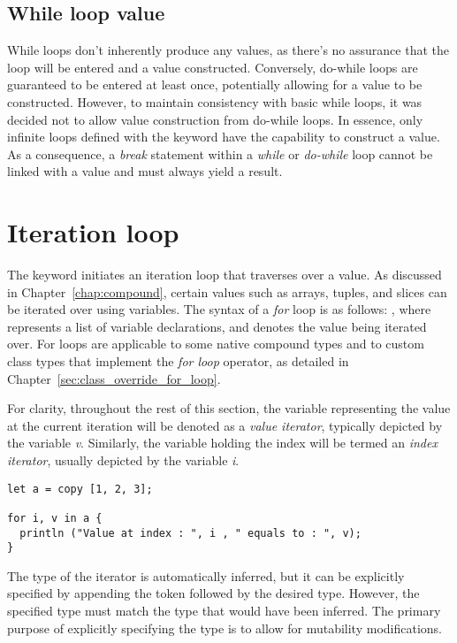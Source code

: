 \subsection{While loop value}

While loops don't inherently produce any values, as there's no assurance that
the loop will be entered and a value constructed. Conversely, do-while loops are
guaranteed to be entered at least once, potentially allowing for a value to be
constructed. However, to maintain consistency with basic while loops, it was
decided not to allow value construction from do-while loops. In essence, only
infinite loops defined with the  keyword have the capability to
construct a value. As a consequence, a \textit{break} statement within a
\textit{while} or \textit{do-while} loop cannot be linked with a value and must
always yield a  result.


\vfill%
\pagebreak

\section{Iteration loop}%
\label{sec:for_loop}

The keyword  initiates an iteration loop that traverses over a value.
As discussed in Chapter~\ref{chap:compound}, certain values such as arrays,
tuples, and slices can be iterated over using variables. The syntax of a
\textit{for} loop is as follows: , where  represents a list of variable declarations, and  denotes the
value being iterated over. For loops are applicable to some native compound
types and to custom class types that implement the \textit{for loop} operator,
as detailed in Chapter~\ref{sec:class_override_for_loop}.

For clarity, throughout the rest of this section, the variable representing the
value at the current iteration will be denoted as a \textit{value iterator},
typically depicted by the variable \textit{v}. Similarly, the variable holding
the index will be termed an \textit{index iterator}, usually depicted by the
variable \textit{i}.

\begin{lstlisting}[style=coloredverbatim, escapechar=@]
let a = copy [1, 2, 3];

for i, v in a {
  println ("Value at index : ", i , " equals to : ", v);
}
\end{lstlisting}

The type of the iterator is automatically inferred, but it can be explicitly
specified by appending the token \token{:} followed by the desired type.
However, the specified type must match the type that would have been inferred.
The primary purpose of explicitly specifying the type is to allow for mutability
modifications.

